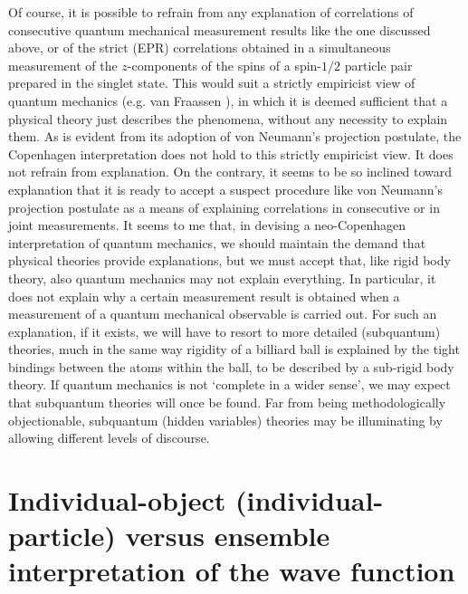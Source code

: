 \documentclass[12pt]{article}
\begin{document}
Of course, it is possible to refrain from any explanation of
correlations of consecutive quantum mechanical measurement results
like the one discussed above, or of the strict (EPR) correlations
obtained in a simultaneous measurement of the $z$-components of
the spins of a spin-$1/2$ particle pair prepared in the singlet
state. This would suit a strictly empiricist view of quantum
mechanics (e.g. van Fraassen \cite{vF91}), in which it is deemed
sufficient that a physical theory just describes the phenomena,
without any necessity to explain them. As is evident from its
adoption of von Neumann's projection postulate, the Copenhagen
interpretation does not hold to this strictly empiricist view. It
does not refrain from explanation. On the contrary, it seems to be
so inclined toward explanation that it is ready to accept a
suspect procedure like von Neumann's projection postulate as a
means of explaining correlations in consecutive or in joint
measurements. It seems to me that, in devising a neo-Copenhagen
interpretation of quantum mechanics, we should maintain the demand
that physical theories provide explanations, but we must accept
that, like rigid body theory, also quantum mechanics may not
explain everything. In particular, it does not explain why a
certain measurement result is obtained when a measurement of a
quantum mechanical observable is carried out. For such an
explanation, if it exists, we will have to resort to more detailed
(subquantum) theories, much in the same way rigidity of a billiard
ball is explained by the tight bindings between the atoms within
the ball, to be described by a sub-rigid body theory. If quantum
mechanics is not `complete in a wider sense', we may expect that
subquantum theories will once be found. Far from being
methodologically objectionable, subquantum (hidden variables)
theories may be illuminating by allowing different levels of
discourse.

\section{Individual-object (individual-particle) versus ensemble interpretation of
the wave function} \label{sec2.2}
\end{document}
